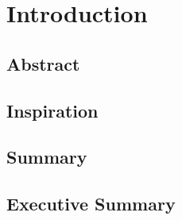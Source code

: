 \documentclass{article}
\begin{document}
	
	\pagebreak

	\tableofcontents
	\pagebreak


	\section{Introduction}
	\blindtext
	\pagebreak
	\subsection{Abstract}
	\subsection{Inspiration}
	\subsection{Summary}
	\subsection{Executive Summary}
	
	

	
\end{document}
